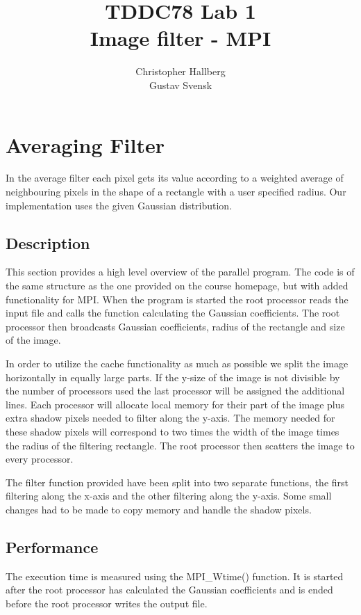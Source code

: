 \documentclass[a4paper, 12pt]{article}
\begin{document}
\title{TDDC78 Lab 1\\
        Image filter - MPI}
\author{Christopher Hallberg \\
        Gustav Svensk}
\maketitle

\thispagestyle{empty}

\newpage
\setcounter{page}{1}
\tableofcontents
\newpage

\section{Averaging Filter}
In the average filter each pixel gets its value according to a weighted average
of neighbouring pixels in the shape of a rectangle with a user specified radius. 
Our implementation uses the given Gaussian distribution.

\subsection{Description}
This section provides a high level overview of the parallel program. 
The code is of the same structure as the one provided on the course homepage,
but with added functionality for MPI. When the
program is started the root processor reads the input file and calls
the function calculating the Gaussian coefficients. The root processor then
broadcasts Gaussian coefficients, radius of the rectangle and size of the image.


In order to utilize the cache functionality as much as possible we split the image
horizontally in equally large parts. If the y-size of the image is not divisible
by the number of processors used the last processor will be assigned the
additional lines. Each processor will allocate local memory for their part of the
image plus extra shadow pixels needed to filter along the y-axis. The memory
needed for these shadow pixels will correspond to two times the width of the
image times the radius of the filtering rectangle. The root processor then 
scatters the image to every processor.  


The filter function provided have been split into two separate functions, the
first filtering along the x-axis and the other filtering along the y-axis. Some
small changes had to be made to copy memory and handle the shadow pixels. 
 

\subsection{Performance}
The execution time is measured using the MPI\_Wtime() function. It is started
after the root processor has calculated the Gaussian
coefficients and is ended before the root processor writes the output file.
\end{document}
